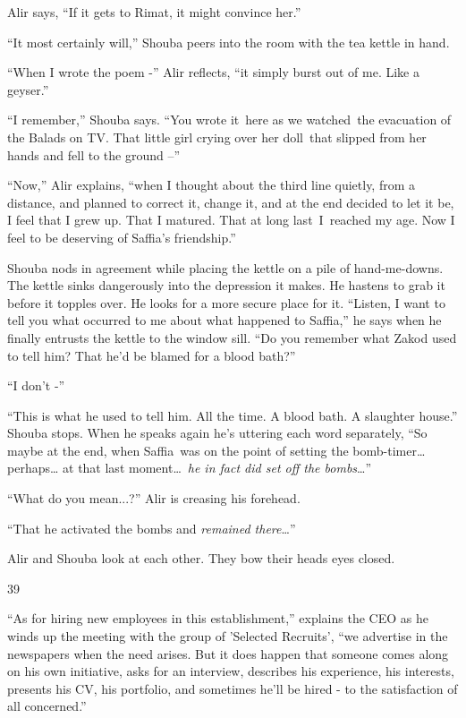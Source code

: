 \documentclass[twoside,11pt]{book}
\begin{document}
Alir says, ``If it gets to Rimat, it might convince her.'' 

``It most certainly will,'' Shouba peers into the room with the tea kettle in hand. 

``When I wrote the poem -{}'' Alir reflects, ``it simply burst out of me. Like a geyser.'' 

``I remember,'' Shouba says. ``You wrote it~here as we watched~the evacuation of
the Balads on TV. That little girl crying over her doll~that slipped from her hands and fell to the ground
--'' 

``Now,'' Alir explains, ``when I thought about the third line quietly, from a
distance, and planned to correct it, change it, and at the end decided to let it be, I feel that I grew up. That I
matured. That at long last~I\ reached my age. Now I feel to be deserving of Saffia's friendship.'' 

Shouba nods in agreement while placing the kettle on a pile of hand-me-downs. The kettle sinks dangerously into the
depression it makes. He hastens to grab it before it topples over. He looks for a more secure place for it.
``Listen, I want to tell you what occurred to me about what happened to Saffia,'' he says
when he finally entrusts the kettle to the window sill. ``Do you remember what Zakod used to tell him?
That he'd be blamed for a blood bath?'' 

``I don't -'' 

``This is what he used to tell him. All the time. A blood bath. A slaughter house.'' Shouba
stops. When he speaks again he{}'s uttering each word separately, ``So maybe at the end, when Saffia~was
on the point of setting the bomb-timer{\dots} perhaps{\dots} at that last moment{\dots}~\textit{he in fact did set off
the bombs}{\dots}'' 

``What do you mean...?'' Alir is creasing his forehead.

``That he activated the bombs and \textit{remained there}{\dots}''

Alir and Shouba look at each other. They bow their heads eyes closed. 


\bigskip

39~~~~~~~~~~~~~~~~~~~ 

``As for hiring new employees in this establishment,{}'' explains the CEO as he winds up the meeting with
the group of 'Selected Recruits', ``we advertise in the newspapers when the need arises. But it does happen that
someone comes along on his own initiative, asks for an interview, describes his experience, his interests, presents his
CV, his portfolio, and sometimes he'll be hired - to the satisfaction of all concerned.'' 
\end{document}
